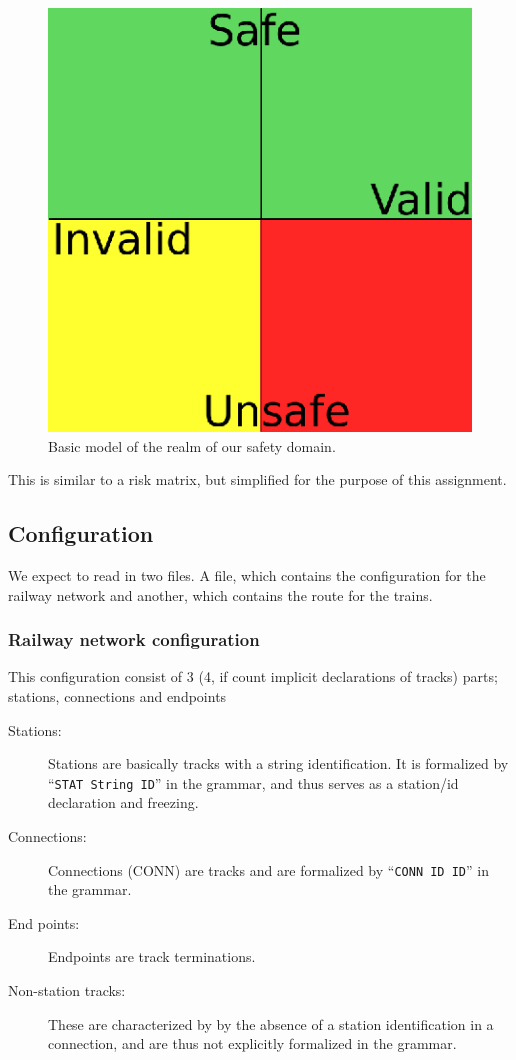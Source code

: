 \documentclass[10pt,a4paper]{article}
\def\Code#1{\texttt{#1}}
\begin{document}
\begin{figure}[h]
\centering
\includegraphics[scale=0.5]{fig/Safety_domains.eps}
 \caption{Basic model of the realm of our safety domain.}
 \label{fig:safety_domain}
\end{figure}
This is similar to a risk matrix, but simplified for the purpose of this assignment.

\subsection{Configuration}
 
We expect to read in two files. A file, which contains the configuration for the railway network and another, which contains the route for the trains.
 
\subsubsection{Railway network configuration}
 
This configuration consist of 3 (4, if count implicit declarations of tracks) parts; stations, connections and endpoints

\begin{description}
\item[Stations:] Stations are basically tracks with a string identification. It is formalized by ``\Code{STAT String ID}'' in the grammar, and thus serves as a station/id declaration and freezing.
\item[Connections:] Connections (CONN) are tracks and are formalized by ``\Code{CONN ID ID}'' in the grammar.
\item[End points:] Endpoints are track terminations.
\item[Non-station tracks:] These are characterized by by the absence of a station identification in a connection, and are thus not explicitly formalized in the grammar.
\end{description} 
\end{document}
